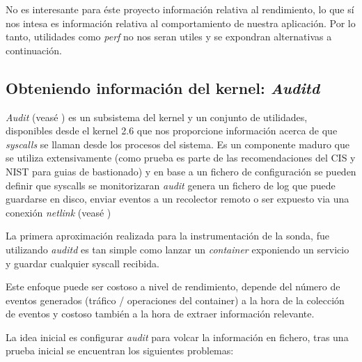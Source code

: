 No es interesante para éste proyecto información relativa al rendimiento, lo que sí nos intesa es información relativa al comportamiento de nuestra aplicación. Por lo tanto,
utilidades como \emph{perf} no nos seran utiles y se expondran alternativas a continuación.

\subsection{Obteniendo información del kernel: \emph{Auditd}}
\label{subsec:auditd}

\emph{Audit} (veasé \cite{redhat-auditd}) es un subsistema del kernel y un conjunto de utilidades, 
disponibles desde el kernel 2.6 que nos proporcione información acerca de que \emph{syscalls}
se llaman desde los procesos del sistema. 
Es un componente maduro que se utiliza extensivamente (como prueba es parte de las recomendaciones del CIS y NIST para guias de bastionado)
y en base a un fichero de configuración se pueden definir que syscalls se monitorizaran
\emph{audit} genera un fichero de log que puede guardarse en disco, enviar eventos a un recolector remoto o ser expuesto via una conexión
\emph{netlink} (veasé \cite{wiki-netlink})

La primera aproximación realizada para la instrumentación de la sonda, fue utilizando \emph{auditd} es tan simple como lanzar un \emph{container} exponiendo un servicio
y guardar cualquier syscall recibida. 

Este enfoque puede ser costoso a nivel de rendimiento, depende del número de eventos generados (tráfico / operaciones del container) a la hora de la colección de eventos
y costoso también a la hora de extraer información relevante.

La idea inicial es configurar \emph{audit} para volcar la información en fichero, tras una prueba inicial se encuentran los siguientes problemas:

